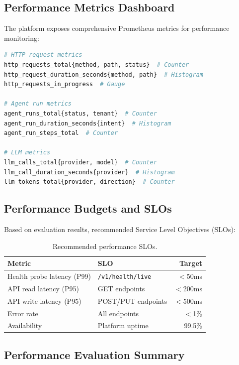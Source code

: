 \subsection{Performance Metrics Dashboard}

The platform exposes comprehensive Prometheus metrics for performance monitoring:

\begin{lstlisting}[language=python,caption={Key performance metrics exposed.}]
# HTTP request metrics
http_requests_total{method, path, status}  # Counter
http_request_duration_seconds{method, path}  # Histogram
http_requests_in_progress  # Gauge

# Agent run metrics
agent_runs_total{status, tenant}  # Counter
agent_run_duration_seconds{intent}  # Histogram
agent_run_steps_total  # Counter

# LLM metrics
llm_calls_total{provider, model}  # Counter
llm_call_duration_seconds{provider}  # Histogram
llm_tokens_total{provider, direction}  # Counter
\end{lstlisting}

\subsection{Performance Budgets and SLOs}

Based on evaluation results, recommended Service Level Objectives (SLOs):

\begin{table}[ht]
\centering
\caption{Recommended performance SLOs.}
\label{tab:performance-slos}
\small
\begin{tabular}{llr}
\hline
\textbf{Metric} & \textbf{SLO} & \textbf{Target} \\
\hline
Health probe latency (P99) & \texttt{/v1/health/live} & $<$50ms \\
API read latency (P95) & GET endpoints & $<$200ms \\
API write latency (P95) & POST/PUT endpoints & $<$500ms \\
Error rate & All endpoints & $<$1\% \\
Availability & Platform uptime & 99.5\% \\
\hline
\end{tabular}
\end{table}

\subsection{Performance Evaluation Summary}

